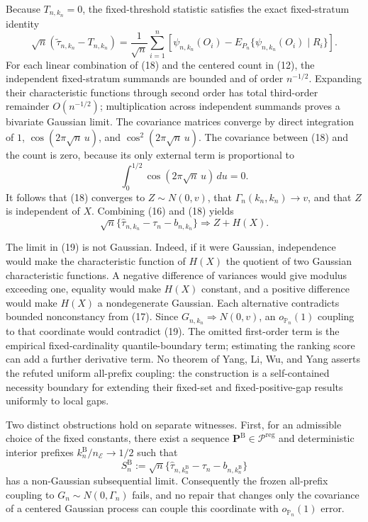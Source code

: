 Because \(T_{n,k_n}=0\), the fixed-threshold statistic satisfies the exact fixed-stratum identity
\[
 \sqrt n(\widetilde\tau_{n,k_n}-T_{n,k_n})
 =\frac1{\sqrt n}\sum_{i=1}^n
 \left[\psi_{n,k_n}(O_i)
 -E_{P_n}\{\psi_{n,k_n}(O_i)\mid R_i\}\right].
\tag{18}
\]
For each linear combination of (18) and the centered count in (12), the independent fixed-stratum summands are bounded and of order \(n^{-1/2}\).  Expanding their characteristic functions through second order has total third-order remainder \(O(n^{-1/2})\); multiplication across independent summands proves a bivariate Gaussian limit.  The covariance matrices converge by direct integration of \(1\), \(\cos(2\pi\sqrt n\,u)\), and \(\cos^2(2\pi\sqrt n\,u)\).  The covariance between (18) and the count is zero, because its only external term is proportional to
\[
 \int_0^{1/2}\cos(2\pi\sqrt n\,u)\,du=0.
\]
It follows that (18) converges to \(Z\sim N(0,v)\), that \(\Gamma_n(k_n,k_n)\to v\), and that \(Z\) is independent of \(X\).  Combining (16) and (18) yields
\[
 \sqrt n\{\widehat\tau_{n,k_n}-\tau_n-b_{n,k_n}\}
 \Rightarrow Z+H(X).
\tag{19}
\]

The limit in (19) is not Gaussian.  Indeed, if it were Gaussian, independence would make the characteristic function of \(H(X)\) the quotient of two Gaussian characteristic functions.  A negative difference of variances would give modulus exceeding one, equality would make \(H(X)\) constant, and a positive difference would make \(H(X)\) a nondegenerate Gaussian.  Each alternative contradicts bounded nonconstancy from (17).  Since \(G_{n,k_n}\Rightarrow N(0,v)\), an \(o_{\mathbb P_n}(1)\) coupling to that coordinate would contradict (19).  The omitted first-order term is the empirical fixed-cardinality quantile-boundary term; estimating the ranking score can add a further derivative term.  No theorem of Yang, Li, Wu, and Yang asserts the refuted uniform all-prefix coupling: the construction is a self-contained necessity boundary for extending their fixed-set and fixed-positive-gap results uniformly to local gaps.

Two distinct obstructions hold on separate witnesses.  First, for an admissible choice of the fixed constants, there exist a sequence \(\mathbf P^{\mathrm B}\in\mathcal P^{\mathrm{reg}}\) and deterministic interior prefixes \(k_n^{\mathrm B}/n_{\mathcal E}\to1/2\) such that
\[
 S_n^{\mathrm B}:=
 \sqrt n\{\widehat\tau_{n,k_n^{\mathrm B}}-\tau_n-b_{n,k_n^{\mathrm B}}\}
\]
has a non-Gaussian subsequential limit.  Consequently the frozen all-prefix coupling to \(G_n\sim N(0,\Gamma_n)\) fails, and no repair that changes only the covariance of a centered Gaussian process can couple this coordinate with \(o_{\mathbb P_n}(1)\) error.

